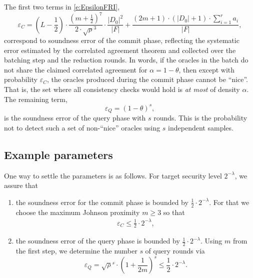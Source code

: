 \documentclass[11pt,article,oneside]{memoir}
\theoremstyle{definition}
\theoremstyle{remark}
\begin{document}

The first two terms in \eqref{e:EpsilonFRI},
\[
\varepsilon_C= \left(L-\frac{1}{2}\right) \cdot \frac {\left(m+ \frac{1}{2}\right)^7}{2\cdot\sqrt\rho^3}\cdot \frac{|D_0|^2}{|F|} 
+ \frac{(2m+1)\cdot (|D_0|+1)\cdot \sum_{i=1}^{r} a_i}{|F|},
\] 
correspond to soundness error of the commit phase, reflecting the systematic error estimated by the correlated agreement theorem and collected over the batching step and the reduction rounds.
In words, 
if the oracles in the batch do not share the claimed correlated agreement for $\alpha = 1-\theta$, then except with probability $\varepsilon_C$,  the oracles produced during the commit phase cannot be ``nice''. 
That is, the set where all consistency checks would hold is \textit{at most} of density $\alpha$.
The remaining term, 
\[
\varepsilon_Q = (1-\theta)^s,
\]
is the soundness error of the query phase with $s$ rounds.
This is the probability not to detect such a set of non-``nice'' oracles using $s$ independent samples. %







\subsection{Example parameters}

One way to settle the parameters is as follows. 
For target security level $2^{-\lambda}$, we assure that 
\begin{enumerate}
\item
the soundness error for the commit phase is bounded by  $\frac{1}{2}\cdot 2^{-\lambda}$. 
For that we choose the maximum Johnson proximity $m\geq 3$ so that 
\[
\begin{aligned}
\varepsilon_C \leq \frac{1}{2}\cdot 2^{-\lambda},
\end{aligned}
\]
\item
the soundness error of the query phase is bounded by $\frac{1}{2}\cdot 2^{-\lambda}$. 
Using $m$ from the first step, we determine the number $s$ of query rounds via
\[
\varepsilon_Q = \sqrt\rho^s \cdot \left(1 + \frac{1}{2m}\right)^s \leq \frac{1}{2}\cdot 2^{-\lambda}.
\]
\end{enumerate}
\end{document}
